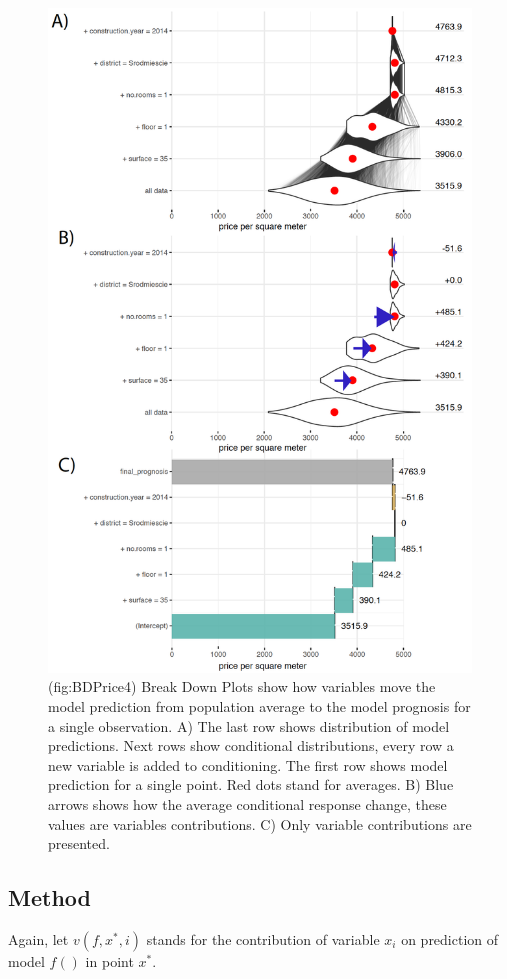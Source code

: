 \documentclass[]{krantz}
\theoremstyle{definition}
\theoremstyle{definition}
\theoremstyle{definition}
\theoremstyle{remark}
\begin{document}
\begin{figure}

{\centering \includegraphics[width=0.7\linewidth]{figure/bd_price_4} 

}

\caption{(fig:BDPrice4) Break Down Plots show how variables move the model prediction from population average to the model prognosis for a single observation. A) The last row shows distribution of model predictions. Next rows show conditional distributions, every row a new variable is added to conditioning. The first row shows model prediction for a single point. Red dots stand for averages. B) Blue arrows shows how the average conditional response change, these values are variables contributions. C) Only variable contributions are presented. }\label{fig:BDPrice4}
\end{figure}

\hypertarget{method-1}{%
\subsection{Method}\label{method-1}}

Again, let \(v(f, x^*, i)\) stands for the contribution of variable
\(x_i\) on prediction of model \(f()\) in point \(x^*\).
\end{document}
